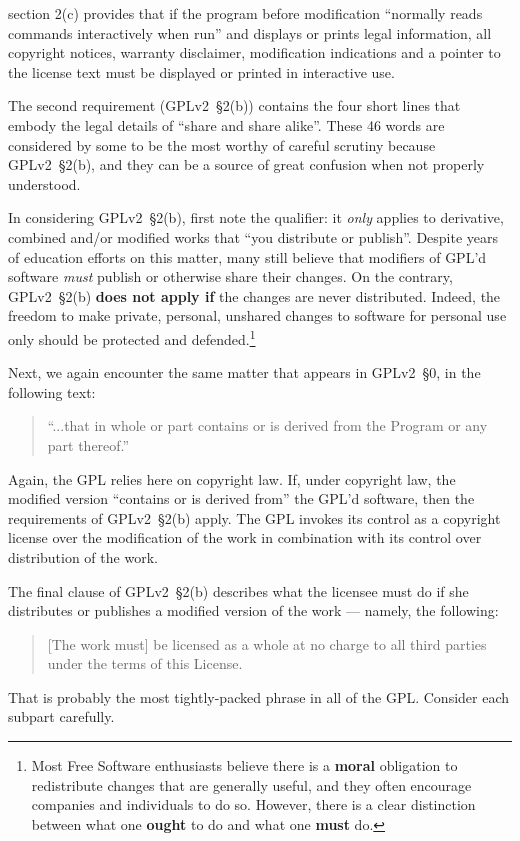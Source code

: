 
section 2(c)
provides that if the program before modification ``normally reads commands
interactively when run'' and displays or prints legal information, all
copyright notices, warranty disclaimer, modification indications and a
pointer to the license text must be displayed or printed in interactive
use.
\medskip

The second requirement (GPLv2~\S2(b)) contains the four short lines that embody
the legal details of ``share and share alike''.  These 46 words are
considered by some to be the most worthy of careful scrutiny because
GPLv2~\S2(b), and they
can be a source of great confusion when not properly understood.

In considering GPLv2~\S2(b), first note the qualifier: it \textit{only} applies to
derivative, combined and/or modified works that ``you distribute or publish''.  Despite years of
education efforts on this matter, many still believe that modifiers
of GPL'd software \textit{must} publish or otherwise
share their changes.  On the contrary, GPLv2~\S2(b) {\bf does not apply if} the
changes are never distributed.  Indeed, the freedom to make private,
personal, unshared changes to software for personal use only should be
protected and defended.\footnote{Most Free Software enthusiasts believe there is a {\bf
    moral} obligation to redistribute changes that are generally useful,
  and they often encourage companies and individuals to do so.  However, there
  is a clear distinction between what one {\bf ought} to do and what one
  {\bf must} do.}

Next, we again encounter the same matter that appears in GPLv2~\S0, in the
following text:
\begin{quote}
``...that in whole or part contains or is derived from the Program or any part thereof.''
\end{quote}
Again, the GPL relies here on copyright law.
If, under copyright law, the modified version ``contains or is
derived from'' the GPL'd software, then the requirements of GPLv2~\S2(b)
apply.  The GPL invokes its control as a copyright license over the
modification of the work in combination with its control over distribution
of the work.

The final clause of GPLv2~\S2(b) describes what the licensee must do if she
distributes or publishes a modified version of the work --- namely, the following:
\begin{quote}
[The work must] be licensed as a whole at no charge to all third parties
under the terms of this License.
\end{quote}
That is probably the most tightly-packed phrase in all of the GPL\@.
Consider each subpart carefully.


